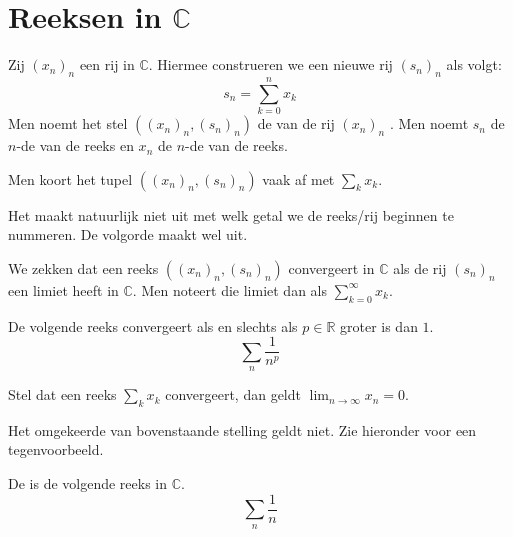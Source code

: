 \documentclass[main.tex]{subfiles}
\begin{document}
\section{Reeksen in $\mathbb{C}$}
\label{sec:reeksen-mathbbc}

\begin{de}
  Zij $(x_{n})_{n}$ een rij in $\mathbb{C}$.
  Hiermee construeren we een nieuwe rij $(s_{n})_{n}$ als volgt:
  \[  s_{n} = \sum_{k=0}^{n}x_{k}  \]
  Men noemt het stel $((x_{n})_{n}, (s_{n})_{n})$ de  van de rij $(x_{n})_{n}$ .
  Men noemt $s_{n}$ de $n$-de  van de reeks en $x_{n}$ de $n$-de  van de reeks.
\end{de}

\begin{de}
  Men koort het tupel $((x_{n})_{n}, (s_{n})_{n})$ vaak af met $\sum_{k}x_{k}$.
\end{de}

\begin{opm}
  Het maakt natuurlijk niet uit met welk getal we de reeks/rij beginnen te nummeren.
  De volgorde maakt wel uit. \needed
\end{opm}

\begin{de}
  We zekken dat een reeks $((x_{n})_{n}, (s_{n})_{n})$ convergeert in $\mathbb{C}$ als de rij $(s_{n})_{n}$ een limiet heeft in $\mathbb{C}$.
  Men noteert die limiet dan als $\sum_{k=0}^{\infty}x_{k}$.
\end{de}

\begin{vb}
  De volgende reeks convergeert als en slechts als $p \in \mathbb{R}$ groter is dan $1$.
  \[ \sum_{n}\frac{1}{n^{p}} \]
\end{vb}

\begin{bpr}
  Stel dat een reeks $\sum_{k}x_{k}$ convergeert, dan geldt $\lim_{n \rightarrow \infty}x_{n} = 0$.
\end{bpr}

\begin{tvb}
  Het omgekeerde van bovenstaande stelling geldt niet.
  Zie hieronder voor een tegenvoorbeeld.
\end{tvb}

\begin{de}
  De  is de volgende reeks in $\mathbb{C}$.
  \[ \sum_{n}\frac{1}{n} \]
\end{de}
\end{document}
